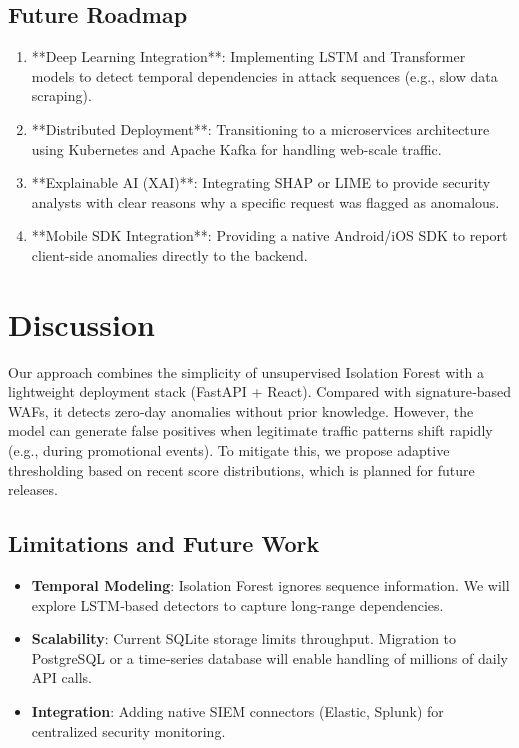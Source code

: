 \documentclass[preprint,12pt,a4paper]{elsarticle}
\begin{document}
\subsection{Future Roadmap}
\begin{enumerate}
    \item **Deep Learning Integration**: Implementing LSTM and Transformer models to detect temporal dependencies in attack sequences (e.g., slow data scraping).
    \item **Distributed Deployment**: Transitioning to a microservices architecture using Kubernetes and Apache Kafka for handling web-scale traffic.
    \item **Explainable AI (XAI)**: Integrating SHAP or LIME to provide security analysts with clear reasons why a specific request was flagged as anomalous.
    \item **Mobile SDK Integration**: Providing a native Android/iOS SDK to report client-side anomalies directly to the backend.
\end{enumerate}


\section{Discussion}
Our approach combines the simplicity of unsupervised Isolation Forest with a lightweight deployment stack (FastAPI + React). Compared with signature‑based WAFs, it detects zero‑day anomalies without prior knowledge. However, the model can generate false positives when legitimate traffic patterns shift rapidly (e.g., during promotional events). To mitigate this, we propose adaptive thresholding based on recent score distributions, which is planned for future releases.

\subsection{Limitations and Future Work}
\begin{itemize}
  \item \textbf{Temporal Modeling}: Isolation Forest ignores sequence information. We will explore LSTM‑based detectors to capture long‑range dependencies.
  \item \textbf{Scalability}: Current SQLite storage limits throughput. Migration to PostgreSQL or a time‑series database will enable handling of millions of daily API calls.
  \item \textbf{Integration}: Adding native SIEM connectors (Elastic, Splunk) for centralized security monitoring.
\end{itemize}
\end{document}
